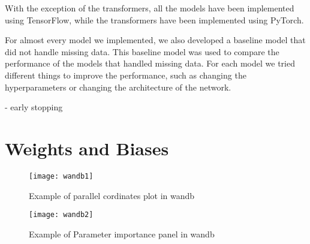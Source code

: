 With the exception of the transformers, all the models have been implemented using TensorFlow, while the transformers have been implemented using PyTorch.

For almost every model we implemented, we also developed a baseline model that did not handle missing data.
This baseline model was used to compare the performance of the models that handled missing data.
For each model we tried different things to improve the performance, such as changing the hyperparameters or changing the architecture of the network.
 

- early stopping\\

\section{Weights and Biases}

\begin{figure}[H]
  \centering
  \texttt{[image: wandb1]}
  \caption{Example of parallel cordinates plot in wandb}
\end{figure}

\begin{figure}[H]
  \centering
  \texttt{[image: wandb2]}
  \caption{Example of Parameter importance panel in wandb}
\end{figure}




